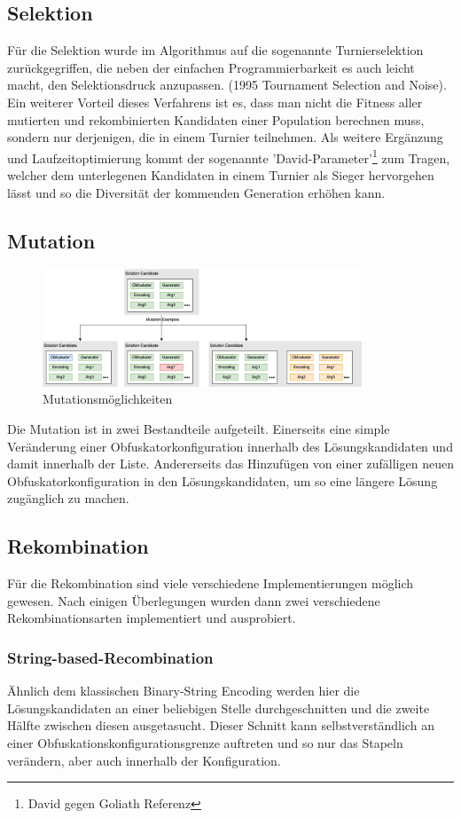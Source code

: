 \subsection{Selektion}
Für die Selektion wurde im Algorithmus auf die sogenannte Turnierselektion zurückgegriffen, die neben der einfachen Programmierbarkeit es auch leicht macht, den Selektionsdruck anzupassen. \cite{blickle_1996_a} (1995 Tournament Selection and Noise). Ein weiterer Vorteil dieses Verfahrens ist es, dass man nicht die Fitness aller mutierten und rekombinierten Kandidaten einer Population berechnen muss, sondern nur derjenigen, die in einem Turnier teilnehmen. Als weitere Ergänzung und Laufzeitoptimierung kommt der sogenannte 'David-Parameter'\footnote{David gegen Goliath Referenz} zum Tragen, welcher dem unterlegenen Kandidaten in einem Turnier als Sieger hervorgehen lässt und so die Diversität der kommenden Generation erhöhen kann.

\subsection{Mutation}
\begin{figure}[h]
    \centering
    \includegraphics[width=0.85\textwidth]{gfx/Abbildungen/Mutations.png}
    \caption{Mutationsmöglichkeiten}
    \label{fig:mutations}
\end{figure}
Die Mutation ist in zwei Bestandteile aufgeteilt. Einerseits eine simple Veränderung einer Obfuskatorkonfiguration innerhalb des Lösungskandidaten und damit innerhalb der Liste. Andererseits das Hinzufügen von einer zufälligen neuen Obfuskatorkonfiguration in den Lösungskandidaten, um so eine längere Lösung zugänglich zu machen.


\subsection{Rekombination}
Für die Rekombination sind viele verschiedene Implementierungen möglich gewesen. Nach einigen Überlegungen wurden dann zwei verschiedene Rekombinationsarten implementiert und ausprobiert.
\subsubsection{String-based-Recombination}
Ähnlich dem klassischen Binary-String Encoding werden hier die Lösungskandidaten an einer beliebigen Stelle durchgeschnitten und die zweite Hälfte zwischen diesen ausgetasucht. Dieser Schnitt kann selbstverständlich an einer Obfuskationskonfigurationsgrenze auftreten und so nur das Stapeln verändern, aber auch innerhalb der Konfiguration.
